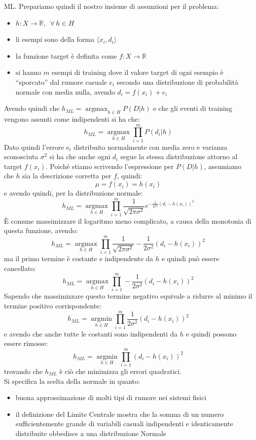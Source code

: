 ML. Prepariamo quindi il nostro insieme di assunzioni per il problema:
\begin{itemize}
  \item $h:X\to\mathbb{R},\,\,\,\forall\, h\in H$
  \item li esempi sono della forma $\langle x_i, d_i\rangle$
  \item la funzione target è definita come $f:X\to\mathbb{R}$
  \item si hanno $m$ esempi di training dove il valore target di ogni esempio è
  ``sporcato'' dal rumore casuale $e_i$ secondo una distribuzione di probabilità
  normale con media nulla, avendo $d_i=f(x_i)+e_i$
\end{itemize}
Avendo quindi che $h_{ML}=\operatorname*{argmax}_{h\in H}P(D|h)$ e che gli
eventi di training vengono assunti come indipendenti si ha che:
\[h_{ML}=\operatorname*{argmax}_{h\in H}\prod_{i=1}^mP(d_i|h)\]
Dato quindi l'errore e$_i$ distribuito normalmente con media zero e varianza
sconosciuta $\sigma^2$ si ha che anche ogni $d_i$ segue la stessa
distribuzione attorno al target $f(x_i)$. Poiché stiamo scrivendo l'espressione
per $P(D|h)$, assumiamo che $h$ sia la descrizione corretta per $f$, quindi:
\[\mu=f(x_i)=h(x_i)\]
e avendo quindi, per la distribuzione normale:
\[h_{ML}=\operatorname*{argmax}_{h\in H}
  \prod_{i=1}^m\frac{1}{\sqrt{2\pi\sigma^2}}
  e^{-\frac{1}{2\sigma^2}(d_i-h(x_i))^2}\]
È comune massimizzare il logaritmo meno complicato, a causa della monotonia di
questa funzione, avendo:
\[h_{ML}=\operatorname*{argmax}_{h\in
    H}\prod_{i=1}^m\frac{1}{\sqrt{2\pi\sigma^2}}
  -\frac{1}{2\sigma^2}(d_i-h(x_i))^2\]
ma il primo termine è costante e indipendente da $h$ e quindi può essere
cancellato:
\[h_{ML}=\operatorname*{argmax}_{h\in
    H}\prod_{i=1}^m -\frac{1}{2\sigma^2}(d_i-h(x_i))^2\]
Sapendo che massimizzare questo termine negativo equivale a ridurre al minimo il
termine positivo corrispondente:
\[h_{ML}=\operatorname*{argmin}_{h\in
    H}\prod_{i=1}^m \frac{1}{2\sigma^2}(d_i-h(x_i))^2\]
e avendo che anche tutte le costanti sono indipendenti da $h$ e quindi possono
essere rimosse:
\[h_{ML}=\operatorname*{argmin}_{h\in H}\prod_{i=1}^m (d_i-h(x_i))^2\]
trovando che $h_{ML}$ è ciò che minimizza gli errori quadratici. \\
Si specifica la scelta della normale in quanto:
\begin{itemize}
  \item buona approssimazione di molti tipi di rumore nei sistemi fisici 
  \item il definizione del Limite Centrale mostra che la somma di un numero
  sufficientemente grande di variabili casuali indipendenti e identicamente
  distribuite obbedisce a una distribuzione Normale 
\end{itemize}
